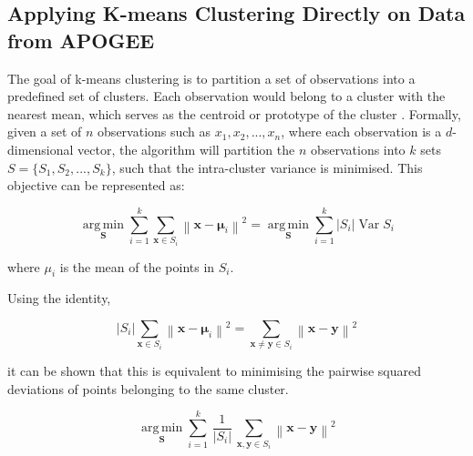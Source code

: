 \subsection{Applying K-means Clustering Directly on Data from APOGEE}
The goal of k-means clustering is to partition a set of observations into a predefined set of clusters. Each observation would belong to a cluster with the nearest mean, which serves as the centroid or prototype of the cluster \citep{macqueen1967some}. Formally, given a set of $n$ observations such as \(x_1,x_2,...,x_n\), where each observation is a $d$-dimensional vector, the algorithm will partition the $n$ observations into $k$ sets $S=\{S_1,S_2,...,S_k\}$, such that the intra-cluster variance is minimised. This objective can be represented as:

\begin{equation}
{\underset {\mathbf {S} }{\operatorname {arg\,min} }}\sum _{i=1}^{k}\sum _{\mathbf {x} \in S_{i}}\left\|\mathbf {x} -{\boldsymbol {\mu }}_{i}\right\|^{2}={\underset {\mathbf {S} }{\operatorname {arg\,min} }}\sum _{i=1}^{k}|S_{i}|\operatorname {Var} S_{i}
\end{equation}

where $\mu_i$ is the mean of the points in $S_i$. 

Using the identity,

\begin{equation}
    |S_{i}|\sum _{\mathbf {x} \in S_{i}}\left\|\mathbf {x} -{\boldsymbol {\mu }}_{i}\right\|^{2}=\sum _{\mathbf {x} \neq \mathbf {y} \in S_{i}}\left\|\mathbf {x} -\mathbf {y} \right\|^{2}
\end{equation}

it can be shown that this is equivalent to minimising the pairwise squared deviations of points belonging to the same cluster.

\begin{equation}
{\underset {\mathbf {S} }{\operatorname {arg\,min} }}\sum _{i=1}^{k}\,{\frac {1}{|S_{i}|}}\,\sum _{\mathbf {x} ,\mathbf {y} \in S_{i}}\left\|\mathbf {x} -\mathbf {y} \right\|^{2}
\end{equation}

